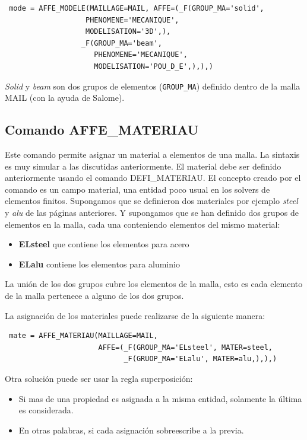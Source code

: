 \documentclass[12pt]{book}
\theoremstyle{definition}
\theoremstyle{remark}
\theoremstyle{plain}
\begin{document}
\begin{verbatim}
 mode = AFFE_MODELE(MAILLAGE=MAIL, AFFE=(_F(GROUP_MA='solid',
                   PHENOMENE='MECANIQUE',
                   MODELISATION='3D',),
                  _F(GROUP_MA='beam',
                     PHENOMENE='MECANIQUE',
                     MODELISATION='POU_D_E',),),)
\end{verbatim}
\textit{Solid} y \textit{beam} son dos grupos de elementos (\verb*|GROUP_MA|) definido 
dentro de la malla MAIL (con la ayuda de Salome).

\subsection{Comando AFFE\_MATERIAU}

Este comando permite asignar un material a elementos de una malla. La sintaxis es 
muy simular a las discutidas anteriormente. El material debe ser definido anteriormente
usando el comando DEFI\_MATERIAU. El concepto creado por el comando es un campo
material, una entidad poco usual en los solvers de elementos finitos. Supongamos 
que se definieron dos materiales por ejemplo \textit{steel} y \textit{alu} de las páginas
anteriores. Y supongamos que se han definido dos grupos de elementos en la malla, cada 
una conteniendo elementos del mismo material:

\begin{itemize}
 \item \textbf{ELsteel} que contiene los elementos para acero
 \item \textbf{ELalu} contiene los elementos para aluminio
\end{itemize}
La unión de los dos grupos cubre los elementos de la malla, esto es cada elemento
de la malla pertenece a alguno de los dos grupos.

La asignación de los materiales puede realizarse de la siguiente manera:

\begin{verbatim}
 mate = AFFE_MATERIAU(MAILLAGE=MAIL, 
                      AFFE=(_F(GROUP_MA='ELsteel', MATER=steel,
                            _F(GRUOP_MA='ELalu', MATER=alu,),),)
\end{verbatim}

Otra solución puede ser usar la regla superposición:

\begin{itemize}
 \item Si mas de una propiedad es asignada a la misma entidad, solamente la
 última es considerada.
 \item En otras palabras, si cada asignación sobreescribe a la previa.
\end{itemize}
\end{document}
